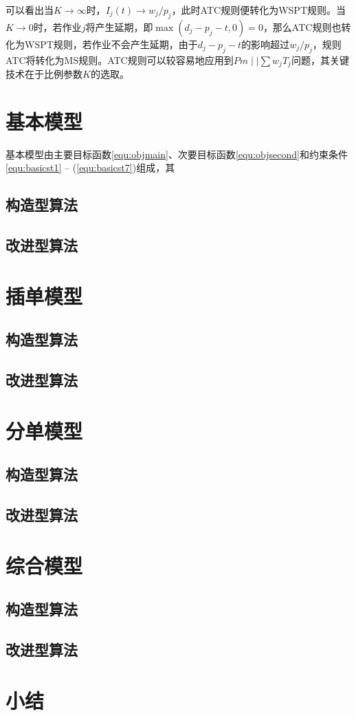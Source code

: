 可以看出当$K \to \infty$时，$I_j(t) \to w_j/p_j$，此时ATC规则便转化为WSPT规则。当$K \to 0$时，若作业$j$将产生延期，即$\max(d_j - p_j -t , 0 ) = 0$，那么ATC规则也转化为WSPT规则，若作业不会产生延期，由于$d_j - p_j - t$的影响超过$w_j/p_j$，规则ATC将转化为MS规则。ATC规则可以较容易地应用到$Pm\mid\mid \sum w_jT_j$问题，其关键技术在于比例参数$K$的选取。
\section{基本模型}
基本模型由主要目标函数\eqref{equ:objmain}、次要目标函数\eqref{equ:objsecond}和约束条件\eqref{equ:basicst1} -- (\ref{equ:basicst7})组成，其
\subsection{构造型算法}

\subsection{改进型算法}
\section{插单模型}
\subsection{构造型算法}

\subsection{改进型算法}
\section{分单模型}
\subsection{构造型算法}

\subsection{改进型算法}
\section{综合模型}
\subsection{构造型算法}

\subsection{改进型算法}

\section{小结}
